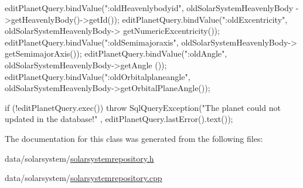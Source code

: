 \begin{DoxyCode}
{    editPlanetQuery.bindValue(":oldHeavenlybodyid", oldSolarSystemHeavenlyBody
      ->getHeavenlyBody()->getId());
    editPlanetQuery.bindValue(":oldExcentricity", oldSolarSystemHeavenlyBody->
      getNumericExcentricity());
    editPlanetQuery.bindValue(":oldSemimajoraxis", oldSolarSystemHeavenlyBody->
      getSemimajorAxis());
    editPlanetQuery.bindValue(":oldAngle", oldSolarSystemHeavenlyBody->getAngle
      ());
    editPlanetQuery.bindValue(":oldOrbitalplaneangle", 
      oldSolarSystemHeavenlyBody->getOrbitalPlaneAngle());

    if (!editPlanetQuery.exec())
    {
        throw SqlQueryException("The planet could not updated in the database!"
      ,
                                editPlanetQuery.lastError().text());
    }
}
\end{DoxyCode}


\-The documentation for this class was generated from the following files\-:\begin{DoxyCompactItemize}
\item 
data/solarsystem/\hyperlink{solarsystemrepository_8h}{solarsystemrepository.\-h}\item 
data/solarsystem/\hyperlink{solarsystemrepository_8cpp}{solarsystemrepository.\-cpp}\end{DoxyCompactItemize}
